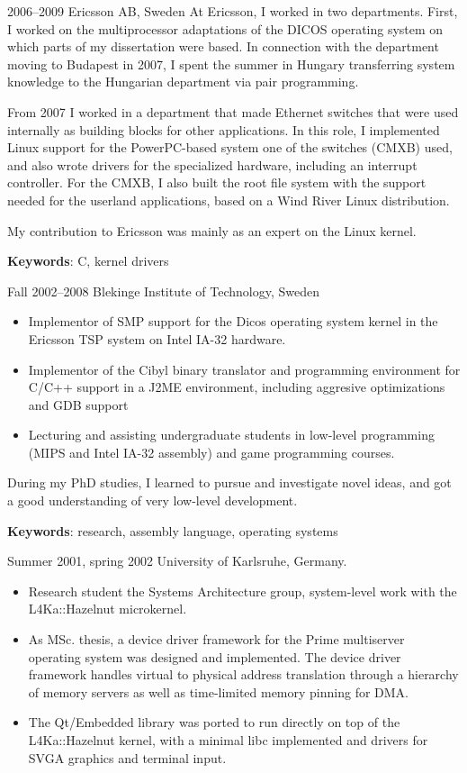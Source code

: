 \documentclass[a4paper]{article}
\begin{document}
\begin{CV}
\item[2006--2009] Ericsson AB, Sweden
At Ericsson, I worked in two departments. First, I worked on the multiprocessor adaptations
of the DICOS operating system on which parts of my dissertation were based. In connection
with the department moving to Budapest in 2007, I spent the summer in Hungary transferring
system knowledge to the Hungarian department via pair programming.

From 2007 I worked in a department that made Ethernet switches that were used internally as
building blocks for other applications. In this role, I implemented Linux support for the
PowerPC-based system one of the switches (CMXB) used, and also wrote drivers for the
specialized hardware, including an interrupt controller. For the CMXB, I also built the root
file system with the support needed for the userland applications, based on a Wind River
Linux distribution.

My contribution to Ericsson was mainly as an expert on the Linux kernel.

\textbf{Keywords}: C, kernel drivers

\item[Fall 2002--2008] Blekinge Institute of Technology, Sweden

  \begin{itemize}
  \item Implementor of SMP support for the Dicos operating system
    kernel in the Ericsson TSP system on Intel IA-32 hardware.
  \item Implementor of the Cibyl binary translator and programming environment
    for C/C++ support in a J2ME environment, including aggresive optimizations
    and GDB support
  \item Lecturing and assisting undergraduate students in low-level
    programming (MIPS and Intel IA-32 assembly) and game programming courses.
  \end{itemize}

During my PhD studies, I learned to pursue and investigate novel ideas, and
got a good understanding of very low-level development.

\textbf{Keywords}: research, assembly language, operating systems

\item[Summer 2001, spring 2002] University of Karlsruhe, Germany.
  \begin{itemize}
  \item Research student the Systems Architecture group, system-level work
    with the L4Ka::Hazelnut microkernel.
  \item As MSc. thesis, a device driver framework for the Prime multiserver
    operating system was designed and implemented. The device driver framework
    handles virtual to physical address translation through a hierarchy of
    memory servers as well as time-limited memory pinning for DMA.
  \item The Qt/Embedded library was ported to run directly on top of the
    L4Ka::Hazelnut kernel, with a minimal libc implemented and drivers for
    SVGA graphics and terminal input.
  \end{itemize}


\end{CV}
\end{document}
